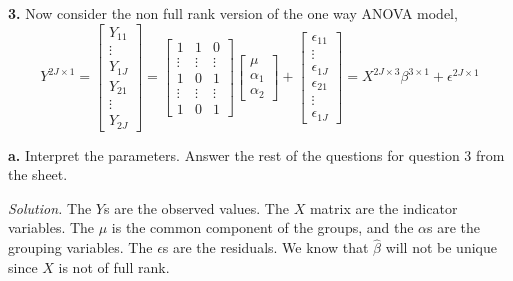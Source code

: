 \documentclass{article}
\begin{document}
\newpage
\textbf{3.} Now consider the non full rank version of the one way ANOVA model, 
\[
Y^{2J\times1} =\begin{bmatrix}
Y_{11}\\
\vdots\\
Y_{1J} \\
Y_{21}\\
\vdots\\
Y_{2J} 
\end{bmatrix}
=
\begin{bmatrix}
1&1&0\\
\vdots & \vdots& \vdots \\
1 & 0& 1 \\
\vdots & \vdots& \vdots\\
1& 0 & 1 
\end{bmatrix}
\begin{bmatrix}
\mu \\
\alpha_1 \\
\alpha_2
\end{bmatrix}
+\begin{bmatrix}
\epsilon_{11}\\
\vdots\\
\epsilon_{1J}\\
\epsilon_{21}\\
\vdots\\
\epsilon_{1J} 
\end{bmatrix}
= X^{2J\times 3}\beta^{3\times1} + \epsilon^{2J\times1}
\]

\textbf{a.} Interpret the parameters. Answer the rest of the questions for question 3 from the sheet.  

\textit{Solution.} The \(Y\)s are the observed values. The \(X\) matrix are the indicator variables. The \(\mu\) is the common component of the groups, and the \(\alpha\)s are the grouping variables.  The \(\epsilon\)s are the residuals. We know that \(\hat \beta \) will not be unique since \(X\) is not of full rank. 
\end{document}
